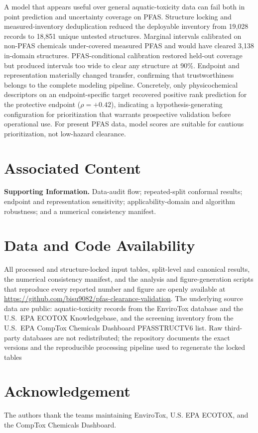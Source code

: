 \documentclass[journal=esthag,manuscript=article,margin=1in]{achemso}
\begin{document}
A model that appears useful over general aquatic-toxicity data can fail both in point prediction and uncertainty coverage on PFAS. Structure locking and measured-inventory deduplication reduced the deployable inventory from 19,028 records to 18,851 unique untested structures. Marginal intervals calibrated on non-PFAS chemicals under-covered measured PFAS and would have cleared 3,138 in-domain structures. PFAS-conditional calibration restored held-out coverage but produced intervals too wide to clear any structure at 90\%. Endpoint and representation materially changed transfer, confirming that trustworthiness belongs to the complete modeling pipeline. Concretely, only physicochemical descriptors on an endpoint-specific target recovered positive rank prediction for the protective endpoint ($\rho=+0.42$), indicating a hypothesis-generating configuration for prioritization that warrants prospective validation before operational use. For present PFAS data, model scores are suitable for cautious prioritization, not low-hazard clearance.

\section*{Associated Content}
\textbf{Supporting Information.} Data-audit flow; repeated-split conformal results; endpoint and representation sensitivity; applicability-domain and algorithm robustness; and a numerical consistency manifest.

\section*{Data and Code Availability}
All processed and structure-locked input tables, split-level and canonical results, the numerical consistency manifest, and the analysis and figure-generation scripts that reproduce every reported number and figure are openly available at
\url{https://github.com/bisu9082/pfas-clearance-validation}.
The underlying source data are public: aquatic-toxicity records from the EnviroTox database and the U.S.\ EPA ECOTOX Knowledgebase, and the screening inventory from the U.S.\ EPA CompTox Chemicals Dashboard PFASSTRUCTV6 list. Raw third-party databases are not redistributed; the repository documents the exact versions and the reproducible processing pipeline used to regenerate the locked tables

\section*{Acknowledgement}
The authors thank the teams maintaining EnviroTox, U.S. EPA ECOTOX, and the CompTox Chemicals Dashboard.


\end{document}
